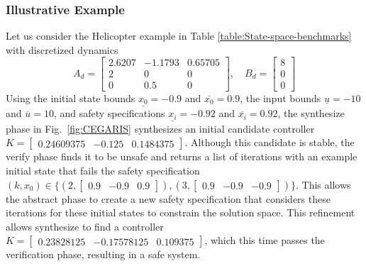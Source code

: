 \documentclass[runningheads,a4paper]{llncs}
\begin{document}
\subsubsection{Illustrative Example}
%
Let us consider the Helicopter example in Table
\ref{table:State-space-benchmarks} with discretized dynamics
%
$$A_d = \left[\begin{array}{ccc}2.6207&-1.1793&0.65705\\2&0&0\\0&0.5&0\end{array}\right],
\quad B_d = \left [\begin{array}{c}8\\0\\0\end{array}\right]$$
%
Using the initial state bounds $\underline{x_{0}}=-0.9$ and
$\overline{x_{0}}=0.9$, the input bounds $\underline{u}=-10$ and
$\overline{u}=10$, and safety specifications $\underline{x_{i}}=-0.92$ and
$\overline{x_{i}}=0.92$, the {\sc synthesize} phase in
Fig.~\ref{fig:CEGARIS} synthesizes an initial candidate controller
$K=[\begin{array}{ccc}0.24609375&-0.125&0.1484375\end{array}]$.
Although this candidate is stable, the {\sc verify} phase finds it to be
unsafe and returns a list of iterations with an example initial state that
fails the safety specification {\footnotesize $(k,x_0) {\in}
\{ (2, [\begin{array}{ccc}0.9&-0.9&0.9\end{array}]),\allowbreak (3,
[\begin{array}{ccc}0.9&-0.9&-0.9\end{array}])\}$}.  This allows the {\sc
abstract} phase to create a new safety specification that considers these
iterations for these initial states to constrain the solution space.  This
refinement allows {\sc synthesize} to find a controller {\footnotesize
$K=[\begin{array}{ccc}0.23828125&-0.17578125&0.109375\end{array}]$}, which
this time passes the verification phase, resulting in a safe system.

\end{document}
